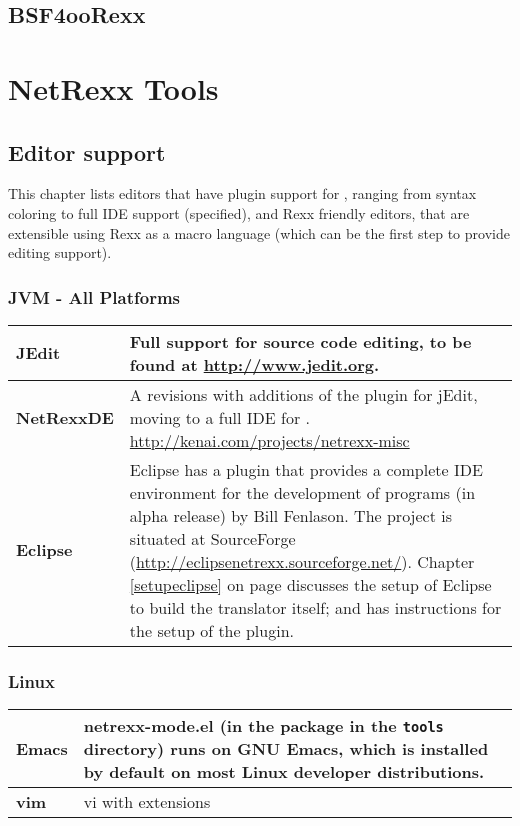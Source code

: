 {{\section{BSF4ooRexx}

\chapter{NetRexx Tools}
\section{Editor support}\label{editors}
This chapter lists editors that have plugin support for \nr{},
ranging from syntax coloring to full IDE support (specified), and
Rexx friendly editors, that are extensible using Rexx as a macro
language (which can be the first step to provide \nr{} editing support).
\subsection{JVM - All Platforms}
\begin{tabularx}{\textwidth}{>{\bfseries}lX}
\toprule
JEdit & Full support for \nr{} source code editing, to be found at
\url{http://www.jedit.org}.
\\\midrule
NetRexxDE & A revisions with additions of the \nr{} plugin for
jEdit, moving to a full IDE for \nr{}. \url{http://kenai.com/projects/netrexx-misc} 
\\\midrule
Eclipse & Eclipse has a \nr{} plugin that provides a complete IDE
environment for the development of \nr{} programs (in alpha release)
by Bill Fenlason. The project is situated at SourceForge
(\url{http://eclipsenetrexx.sourceforge.net/}). Chapter
\ref{setupeclipse} on page \pageref{setupeclipse} discusses the setup
of Eclipse to build the translator itself; and has
instructions for the setup of the \nr{} plugin.
\\\bottomrule
\end{tabularx}
\subsection{Linux}
\begin{tabularx}{\textwidth}{>{\bfseries}lX}
\toprule
Emacs & netrexx-mode.el (in the \nr{} package in the \texttt{tools}
directory) runs on GNU Emacs, which is installed by default on most
Linux developer distributions.
\\\midrule
vim & vi with extensions
\\\bottomrule
\end{tabularx}
}}
